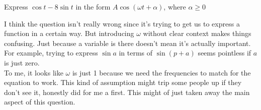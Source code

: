\documentclass[a4paper, 12pt]{report}
\def\ni{blue!20!white}
\begin{document}
    \newpage
    \begin{tcolorbox}[title=\color{black}{\section{Q4}}, colback=white, colframe=\ni, boxrule=1mm, width=1\textwidth]
        Express \( \cos t-8 \sin t \) in the form \( A \cos (\omega t+\alpha) \), where \( \alpha \geq 0 \)
    \end{tcolorbox}
    \raggedright
    I think the question isn’t really wrong since it’s trying to get us to express a function in a certain way. But introducing \( \omega \) without clear context makes things confusing. Just because a variable is there doesn’t mean it’s actually important. For example, trying to express \(\sin a\) in terms of \(\sin(p + a)\) seems pointless if \(a\) is just zero.\\[1em]
    
    To me, it looks like \( \omega \) is just 1 because we need the frequencies to match for the equation to work. This kind of assumption might trip some people up if they don’t see it, honestly did for me a first. This might of just taken away the main aspect of this question.\\[4em]
\end{document}
